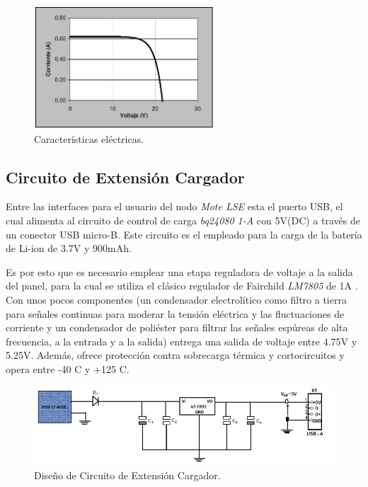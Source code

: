 {%

\vspace{30px}
\begin{figure}[h!]
	\centering
    \includegraphics[width=0.6\textwidth]{./Figures/curva.JPG}
    	\caption{Características eléctricas.}
	\label{fig:curva}
\end{figure}

\clearpage
\subsection{Circuito de Extensión Cargador}
\label{subsec:extensión}
Entre las interfaces para el usuario del nodo \textit{Mote LSE} esta el puerto USB, el cual alimenta al circuito de control de carga \textit{bq24080 1-A} con 5V(DC) a través de un conector USB micro-B. Este circuito es el empleado para la carga de la batería de Li-ion de 3.7V y 900mAh.

Es por esto que es necesario emplear una etapa reguladora de voltaje a la salida del panel, para la cual se utiliza el clásico regulador de Fairchild \textit{LM7805} de 1A \citep{7805}. Con unos pocos componentes (un condensador electrolítico como filtro a tierra para señales continuas para moderar la tensión eléctrica y las fluctuaciones de corriente y un condensador de poliéster para filtrar las señales espúreas de alta frecuencia, a la entrada y a la salida) entrega una salida de voltaje entre 4.75V y 5.25V. Además, ofrece protección contra sobrecarga térmica y cortocircuitos y opera entre -40 \grados C y +125 \grados C.

\vspace{30px}
\begin{figure}[h!]
	\centering
    \includegraphics[width=1\textwidth]{./Figures/circuito.jpg}
    	\caption{Diseño de Circuito de Extensión Cargador.}
	\label{fig:circuito}
\end{figure}

}
